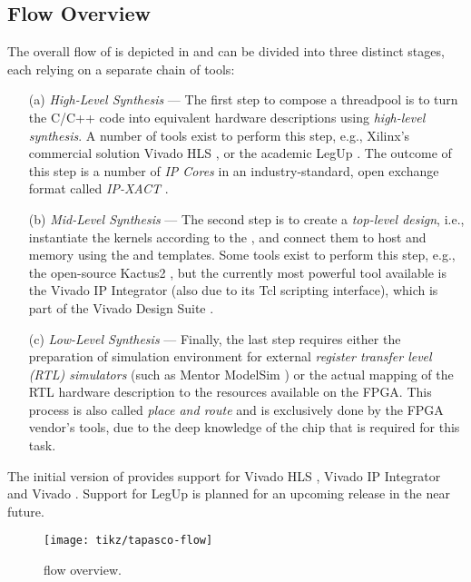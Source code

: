 \subsection*{Flow Overview}\label{sec:flow-overview}%
The overall flow of \tapasco{} is depicted in  and can be divided into three distinct stages, each relying on a separate chain of tools:

\begin{enumerate}
  \item[(a)] \emph{High-Level Synthesis} --- The first step to compose a threadpool is to turn the C/C++  code into equivalent hardware descriptions using \emph{high-level synthesis}. A number of tools exist to perform this step, e.g., Xilinx's commercial solution Vivado HLS \cite{vivado-hls}, or the academic LegUp \cite{legup}. The outcome of this step is a number of \emph{IP Cores} in an industry-standard, open exchange format called \emph{IP-XACT} \cite{ip-xact}.
  \item[(b)] \emph{Mid-Level Synthesis} --- The second step is to create a \emph{top-level design}, i.e., instantiate the kernels according to the , and connect them to host and memory using the  and  templates. Some tools exist to perform this step, e.g., the open-source Kactus2 \cite{kactus2}, but the currently most powerful tool available is the Vivado IP Integrator (also due to its Tcl scripting interface), which is part of the Vivado Design Suite \cite{vivado}.
  \item[(c)] \emph{Low-Level Synthesis} --- Finally, the last step requires either the preparation of simulation environment for external \emph{register transfer level (RTL) simulators} (such as Mentor ModelSim \cite{modelsim}) or the actual mapping of the RTL hardware description to the resources available on the FPGA. This process is also called \emph{place and route} and is exclusively done by the FPGA vendor's tools, due to the deep knowledge of the chip that is required for this task.
\end{enumerate}

The initial version of \tapasco{} provides support for Vivado HLS \cite{vivado-hls}, Vivado IP Integrator and Vivado \cite{vivado}.
Support for LegUp \cite{legup} is planned for an upcoming release in the near future.

\begin{figure}
  \centering\texttt{[image: tikz/tapasco-flow]}
  \caption{\tapasco{} flow overview.}
  \label{fig:flow-overview}
\end{figure}


